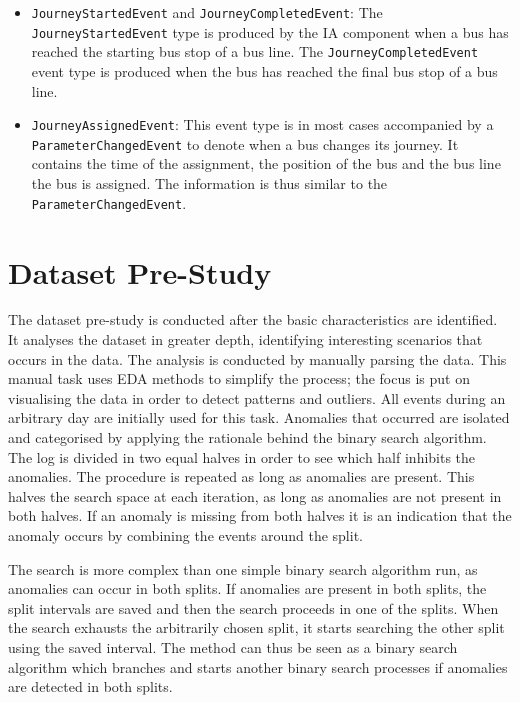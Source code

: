 \begin{itemize}
    \item \texttt{JourneyStartedEvent} and \texttt{JourneyCompletedEvent}: \newline
    The \texttt{JourneyStartedEvent} type is produced by the IA component when a bus has reached the starting bus stop of a bus line.
    The \texttt{JourneyCompletedEvent} event type is produced when the bus has reached the final bus stop of a bus line.

    \item \texttt{JourneyAssignedEvent}:
    This event type is in most cases accompanied by a \texttt{ParameterChangedEvent} to denote when a bus changes its journey.
    It contains the time of the assignment, the position of the bus and the bus line the bus is assigned.
    The information is thus similar to the \texttt{ParameterChangedEvent}.
\end{itemize}

\section{Dataset Pre-Study}
The dataset pre-study is conducted after the basic characteristics are identified.
It analyses the dataset in greater depth, identifying interesting scenarios that occurs in the data.
The analysis is conducted by manually parsing the data.
This manual task uses EDA methods to simplify the process; the focus is put on visualising the data in order to detect patterns and outliers.
All events during an arbitrary day are initially used for this task.
Anomalies that occurred are isolated and categorised by applying the rationale behind the binary search algorithm.
The log is divided in two equal halves in order to see which half inhibits the anomalies.
The procedure is repeated as long as anomalies are present.
This halves the search space at each iteration, as long as anomalies are not present in both halves.
If an anomaly is missing from both halves it is an indication that the anomaly occurs by combining the events around the split.

The search is more complex than one simple binary search algorithm run, as anomalies can occur in both splits.
If anomalies are present in both splits, the split intervals are saved and then the search proceeds in one of the splits.
When the search exhausts the arbitrarily chosen split, it starts searching the other split using the saved interval.
The method can thus be seen as a binary search algorithm which branches and starts another binary search processes if anomalies are detected in both splits. 

